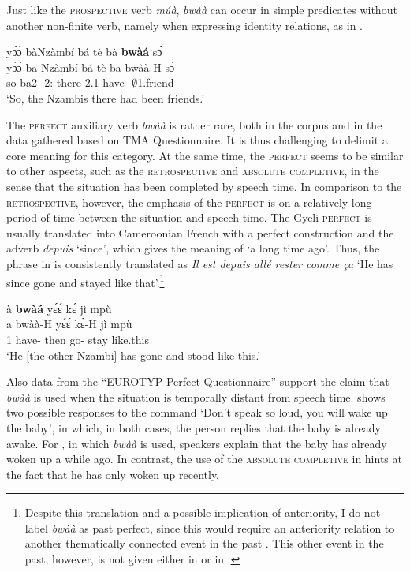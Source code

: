 Just like the \textsc{prospective} verb {\itshape múà}, {\itshape bwàà} can occur in simple predicates without another non-finite verb, namely when expressing identity relations, as in .


\ea\label{Pbwaa1}
  \glll  yɔ́ɔ̀ bàNzàmbí bá tè bà {\bfseries bwàá} sɔ́ \\
         yɔ́ɔ̀ ba-Nzàmbí bá tè ba bwàà-H sɔ́\\
            so ba2-{\PN} 2:{\ATT} there 2.{\PST}1 have-{\R} $\emptyset$1.friend\\
    \trans `So, the Nzambis there had been friends.'
\z


The \textsc{perfect} auxiliary verb {\itshape bwàà} is rather rare, both in the corpus and in the data gathered based on  TMA Questionnaire. It is thus challenging to delimit a core meaning for this category. At the same time, the \textsc{perfect} seems to be similar to other aspects, such as the \textsc{retrospective} and \textsc{absolute completive},  in the sense that the situation has been completed by speech time. In comparison to the \textsc{retrospective}, however, the emphasis of the \textsc{perfect} is on a relatively long period of time between the situation and speech time. The Gyeli \textsc{perfect} is usually translated into Cameroonian French with a perfect construction and the adverb {\itshape depuis} `since',  which gives the meaning of `a long time ago'. Thus, the phrase in  is consistently translated as {\itshape Il est depuis allé rester comme ça} `He has since gone and stayed like that'.\footnote{Despite this translation and a possible implication of anteriority, I do not label {\itshape bwàà} as past perfect, since this would require an anteriority  relation to another thematically connected event in the past \citep{lee2017}. This other event in the past, however, is not given either in  or in .}

\ea\label{bwaa2}
  \glll à {\bfseries bwàá} yɛ́ɛ́ kɛ́ jì mpù \\
       a bwàà-H yɛ́ɛ́ kɛ̀-H jì mpù \\
        1 have-{\R} then go-{\R} stay like.this\\
    \trans `He [the other Nzambi] has gone and stood like this.'
\z


Also data from the ``EUROTYP Perfect Questionnaire'' \citep{dahl2000} support the claim that {\itshape bwàà} is used when the situation is temporally distant from speech time.  shows two possible responses to the command `Don't speak so loud, you will wake up the baby', in which, in both cases, the person replies that the baby is already awake. For , in which {\itshape bwàà} is used, speakers explain that the baby has already woken up a while ago. In contrast, the use of the \textsc{absolute completive} in  hints at the fact that he has only woken up recently.

